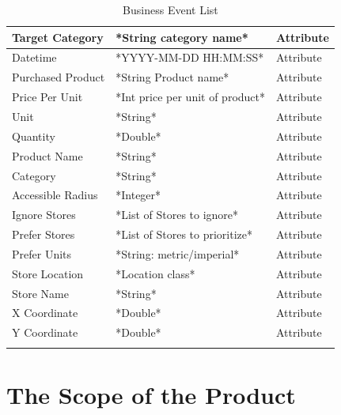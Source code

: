\documentclass[12pt]{article}
\begin{document}
\begin{longtable}{| >{\raggedright\arraybackslash}p{} | >{\raggedright\arraybackslash}p{} | >{\raggedright\arraybackslash}p{} |}
        Target Category & *String category name* & Attribute \\
        \hline 
        Datetime & *YYYY-MM-DD HH:MM:SS* & Attribute \\
        \hline 
        Purchased Product & *String Product name* & Attribute \\
        \hline 
        Price Per Unit & *Int price per unit of product* & Attribute \\
        \hline 
        Unit & *String* & Attribute \\
        \hline 
        Quantity & *Double* & Attribute \\
        \hline 
        Product Name & *String* & Attribute \\
        \hline 
        Category & *String* & Attribute \\
        \hline 
        Accessible Radius & *Integer* & Attribute \\
        \hline 
        Ignore Stores & *List of Stores to ignore* & Attribute \\
        \hline 
        Prefer Stores & *List of Stores to prioritize* & Attribute \\
        \hline 
        Prefer Units & *String: metric/imperial* & Attribute \\
        \hline
        Store Location & *Location class* & Attribute \\
        \hline 
        Store Name & *String* & Attribute \\
        \hline 
        X Coordinate & *Double* & Attribute \\
        \hline 
        Y Coordinate & *Double* & Attribute \\
        \hline 
        \caption{Business Event List}
        \label{tab:businesseventlist}
    \end{longtable}

\section{The Scope of the Product}
\end{document}
